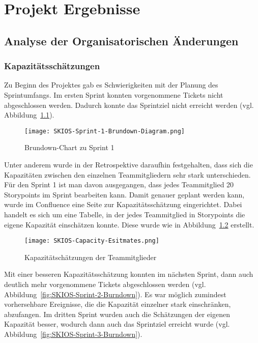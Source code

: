 
\chapter{Projekt Ergebnisse}\label{proj_ergebnisse}

\section{Analyse der Organisatorischen Änderungen}

\subsection{Kapazitätsschätzungen}

Zu Beginn des Projektes gab es Schwierigkeiten mit der Planung des Sprintumfangs.
Im ersten Sprint konnten vorgenommene Tickets nicht abgeschlossen werden. 
Dadurch konnte das Sprintziel nicht erreicht werden (vgl. Abbildung~\ref{fig:SKIOS-Sprint-1-Brundown}).

\begin{figure}[h]
    \texttt{[image: SKIOS-Sprint-1-Brundown-Diagram.png]}
    \caption{Brundown-Chart zu Sprint 1}
    \label{fig:SKIOS-Sprint-1-Brundown}
\end{figure}

Unter anderem wurde in der Retrospektive daraufhin festgehalten, 
dass sich die Kapazitäten zwischen den einzelnen Teammitgliedern sehr stark unterschieden.
Für den Sprint 1 ist man davon ausgegangen, dass jedes Teammitglied 20 Storypoints im Sprint bearbeiten kann.
Damit genauer geplant werden kann, wurde im Confluence eine Seite zur Kapazitätsschätzung eingerichtet.
Dabei handelt es sich um eine Tabelle, in der jedes Teammitglied in Storypoints die eigene Kapazität einschätzen konnte.
Diese wurde wie in Abbildung~\ref{fig:Capacitytable} erstellt. 

\begin{figure}[h]
    \texttt{[image: SKIOS-Capacity-Esitmates.png]}
    \caption{Kapazitätschätzungen der Teammitglieder}
    \label{fig:Capacitytable}
\end{figure}

Mit einer besseren Kapazitätsschätzung konnten im nächsten Sprint, dann auch deutlich mehr vorgenommene Tickets abgeschlossen werden (vgl. Abbildung~\ref{fig:SKIOS-Sprint-2-Burndown}).
Es war möglich zumindest vorhersehbare Ereignisse, die die Kapazität einzelner stark einschränken, abzufangen.
Im dritten Sprint wurden auch die Schätzungen der eigenen Kapazität besser, wodurch dann auch das Sprintziel erreicht wurde (vgl. Abbildung~\ref{fig:SKIOS-Sprint-3-Burndown}).

